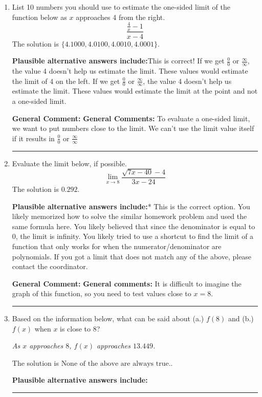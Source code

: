 \documentclass{extbook}[14pt]
\newcommand{\litem}[1]{\item #1

\rule{\textwidth}{0.4pt}}
\begin{document}
\begin{enumerate}\litem{
List 10 numbers you should use to estimate the one-sided limit of the function below as $x$ approaches 4 from the right.
\[ \frac{\frac{4}{x} - 1}{x - 4} \]The solution is \( \{ 4.1000, 4.0100, 4.0010, 4.0001 \} \).\begin{enumerate}[label=\Alph*.]
\textbf{Plausible alternative answers include:}This is correct!
If we get $\frac{0}{0}$ or $\frac{\infty}{\infty}$, the value 4 doesn't help us estimate the limit.
These values would estimate the limit of 4 on the left.
If we get $\frac{0}{0}$ or $\frac{\infty}{\infty}$, the value 4 doesn't help us estimate the limit.
These values would estimate the limit at the point and not a one-sided limit.
\end{enumerate}

\textbf{General Comment:} \textbf{General Comments:} To evaluate a one-sided limit, we want to put numbers close to the limit. We can't use the limit value itself if it results in $\frac{0}{0}$ or $\frac{\infty}{\infty}$
}
\litem{
Evaluate the limit below, if possible.
\[ \lim_{x \rightarrow 8} \frac{\sqrt{7x - 40} - 4}{3x - 24} \]The solution is \( 0.292 \).\begin{enumerate}[label=\Alph*.]
\textbf{Plausible alternative answers include:}* This is the correct option.
You likely memorized how to solve the similar homework problem and used the same formula here.
You likely believed that since the denominator is equal to 0, the limit is infinity.
You likely tried to use a shortcut to find the limit of a function that only works for when the numerator/denominator are polynomials.
If you got a limit that does not match any of the above, please contact the coordinator.
\end{enumerate}

\textbf{General Comment:} \textbf{General comments:} It is difficult to imagine the graph of this function, so you need to test values close to $x = 8$.
}
\litem{
Based on the information below, what can be said about (a.) $f(8)$ and (b.) $f(x)$ when $x$ is close to $8$?

\begin{center}
    \textit{ As $x$ approaches $8$, $f(x)$ approaches $13.449$. }
\end{center}
The solution is \( \text{None of the above are always true.} \).\begin{enumerate}[label=\Alph*.]
\textbf{Plausible alternative answers include:}





\end{enumerate}}
\end{enumerate}
\end{document}
